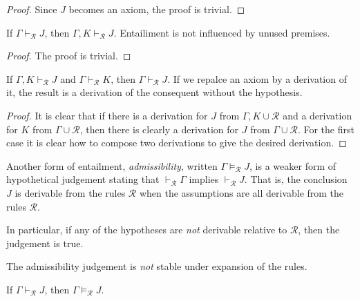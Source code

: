 \begin{proof}
    Since $J$ becomes an axiom, the proof is trivial.
\end{proof}


\begin{lemma}[Weakening]
    If $\Gamma \vdash_{\mathcal{R}} J$, then $\Gamma, K \vdash_{\mathcal{R}} J$. Entailiment is not influenced by unused premises.
\end{lemma}

\begin{proof}
    The proof is trivial.
\end{proof}


\begin{lemma}[Transitivity]\label{derivability_transitivity}
    If $\Gamma, K \vdash_{\mathcal{R}} J$ and $\Gamma \vdash_{\mathcal{R}} K$, then $\Gamma \vdash_{\mathcal{R}} J$. If we repalce an axiom by a derivation of it, the result is a derivation of the consequent without the hypothesis.
\end{lemma}

\begin{proof}
    It is clear that if there is a derivation for $J$ from $\Gamma,K \cup \mathcal{R}$ and a derivation for $K$ from $\Gamma \cup \mathcal{R}$, then there is clearly a derivation for $J$ from $\Gamma \cup \mathcal{R}$. For the first case it is clear how to compose two derivations to give the desired derivation.
\end{proof}

\begin{defin}
    Another form of entailment, \emph{admissibility}, written $\Gamma \vDash_{\mathcal{R}} J$, is a weaker form of hypothetical judgement stating that $\vdash_{\mathcal{R}} \Gamma$ implies $\vdash_{\mathcal{R}} J$. That is, the conclusion $J$ is derivable from the rules $\mathcal{R}$ when the assumptions are all derivable from the rules $\mathcal{R}$.
\end{defin}

\begin{remark}
    In particular, if any of the hypotheses are \emph{not} derivable relative to $\mathcal{R}$, then the judgement is  true.
\end{remark}


The admissibility judgement is \emph{not} stable under expansion of the rules.

\begin{lemma}
    If $\Gamma \vdash_{\mathcal{R}} J$, then $\Gamma \vDash_{\mathcal{R}} J$.
\end{lemma}

